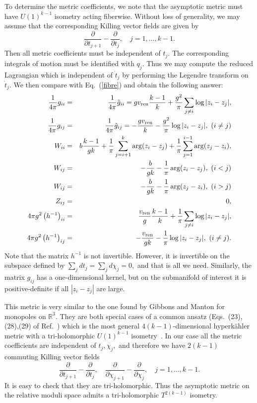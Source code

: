 \documentclass[a4paper,12pt, amsfonts, amssymb]{article}
\newcommand{\RR}{{\mathbb R}}
\newcommand{\nn}{\nonumber}
\newcommand{\vr}{v_{{\rm ren}}}
\begin{document}
To determine the metric coefficients, we note that the asymptotic
metric must have $U(1)^{k-1}$ isometry acting fiberwise.
Without loss of generality, we may assume that the corresponding Killing
vector fields are given by
$$
\frac{\partial}{\partial t_{j+1}}-\frac{\partial}{\partial t_j},
\quad j=1,\ldots,k-1.
$$
Then all metric coefficients must be independent of $t_j.$ The corresponding
integrals of motion must be identified with $q_j.$ Thus we may
compute the reduced Lagrangian which is independent of $\dot{t}_j$
by performing the Legendre transform on $\dot{t}_j.$
We then compare with Eq.~(\ref{fibre}) and obtain the following
answer:
\begin{eqnarray}
\frac{1}{4\pi} g_{ii}&=&\frac{1}{4\pi}\tilde{g}_{ii}=g\vr\frac{k-1}{k}+\frac{g^2}{\pi}
\sum_{j\neq i}\log|z_i-z_j|,\nn\\
\frac{1}{4\pi}g_{ij}&=&\frac{1}{4\pi}\tilde{g}_{ij}=-\frac{g\vr}{k}-
\frac{g^2}{\pi}\log|z_i-z_j|,\ (i\neq j)\nn\\
W_{ii}&=&b\frac{k-1}{gk}+\frac{1}{\pi}
\sum_{j=i+1}^k\arg(z_i-z_j)+\frac{1}{\pi}\sum_{j=1}^{i-1}\arg(z_j-z_i),\nn\\
W_{ij}&=&-\frac{b}{gk}-\frac{1}{\pi}\arg(z_i-z_j),\ (i<j)\nn\\
W_{ij}&=&-\frac{b}{gk}-\frac{1}{\pi}\arg(z_j-z_i),\ (i>j)\nn\\
Z_{ij}&=&0,\nn\\
4\pi g^2 \left(h^{-1}\right)_{ii}&=&
\frac{\vr}{g}\frac{k-1}{k}+\frac{1}{\pi}
\sum_{j\neq i}\log|z_i-z_j|,\nn\\
4\pi g^2 \left(h^{-1}\right)_{ij}&=&
-\frac{\vr}{gk}-\frac{1}{\pi}\log|z_i-z_j|,\ (i\neq j).\nn
\end{eqnarray}
Note that the matrix $h^{-1}$ is not invertible. However, it is
invertible on the subspace defined by $\sum_j dt_j=\sum_j d\chi_j=0,$
and that is all we need. Similarly, the matrix $g_{ij}$ has a
one-dimensional kernel, but on the submanifold of interest it is
positive-definite if all $|z_i-z_j|$ are large.

This metric is very similar to the one found by Gibbons and
Manton for monopoles on $\RR^3$. They are both special cases of a common
ansatz (Eqs.~(23),(28),(29) of Ref.~\cite{GM}) which is the most general
$4(k-1)$-dimensional hyperk\"ahler metric with a tri-holomorphic $U(1)^{k-1}$
isometry~\cite{HKLR,PP}.
In our case all the metric coefficients are independent of $t_j,\chi_j,$ and therefore we have $2(k-1)$  commuting Killing vector fields
\begin{equation}\label{killing}
\frac{\partial}{\partial t_{j+1}}-\frac{\partial}{\partial t_j},\quad
\frac{\partial}{\partial\chi_{j+1}}-\frac{\partial}{\partial\chi_j},
\quad j=1,\ldots,k-1.
\end{equation}
It is easy to check that they are tri-holomorphic. Thus the asymptotic
metric on the relative moduli space admits a tri-holomorphic
$T^{2(k-1)}$ isometry.
\end{document}

